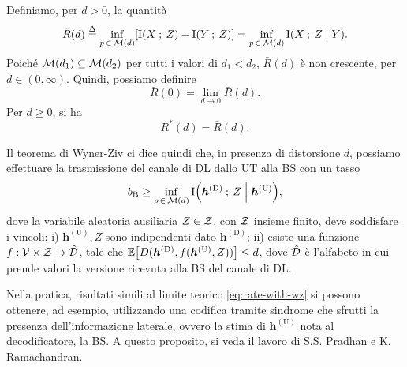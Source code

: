 \begin{thm}
    \label{thm:wz}

    Definiamo, per \(d > 0\), la quantità
    \begin{equation}
        \bar{R}(d) \define \inf_{p\,\in\,\set{M}(d)} \mleft[
            \mutual{X}{Z} - \mutual{Y}{Z}
            \mright]
        = \inf_{p\,\in\,\set{M}(d)} \mutual{X}{Z \given Y} .
    \end{equation}
    Poiché \(\mathcal{M}(d_1) \subseteq \mathcal{M}(d_2)\) per tutti i valori di \(d_1
    < d_2\), \(\bar{R}(d)\) è non crescente, per \(d \in (0,\infty)\). Quindi,
    possiamo definire
    \begin{equation}
        \bar{R}(0) = \lim_{d\to0} \bar{R}(d) .
    \end{equation}
    Per \(d \ge 0\), si ha
    \begin{equation}
        R^{*}(d) = \bar{R}(d) .
    \end{equation}
\end{thm}

Il teorema di Wyner-Ziv ci dice quindi che, in presenza di distorsione \(d\),
possiamo effettuare la trasmissione del canale di DL dallo UT alla BS con un
tasso
\begin{equation}
    b_\mathrm{B} \ge \inf_{p\,\in\,\set{M}(d)}
    \mutual{\bm{h}^\mathrm{(D)}}{Z \given \bm{h}^\mathrm{(U)}} ,
    \label{eq:rate-with-wz}
\end{equation}
dove la variabile aleatoria ausiliaria \(Z \in \mathcal{Z}\), con \(\mathcal{Z}\)
insieme finito, deve soddisfare i vincoli: i) \(\bm{h}^\mathrm{(U)},Z\) sono
indipendenti dato \(\bm{h}^\mathrm{(D)}\); ii) esiste una funzione \(f: \mathcal{V}
\times \mathcal{Z} \to \hat{\mathcal{D}}\), tale che \(\expect{D(\bm{h}^\mathrm{(D)},
f(\bm{h}^\mathrm{(U)},Z))} \le d\), dove \(\hat{\mathcal{D}}\) è l'alfabeto in cui
prende valori la versione ricevuta alla BS del canale di DL.

Nella pratica, risultati simili al limite teorico \eqref{eq:rate-with-wz} si
possono ottenere, ad esempio, utilizzando una codifica tramite sindrome che
sfrutti la presenza dell'informazione laterale, ovvero la stima di
\(\bm{h}^\mathrm{(U)}\) nota al decodificatore, la BS. A questo proposito, si
veda il lavoro di S.S. Pradhan e K. Ramachandran\cite{1184140}.


